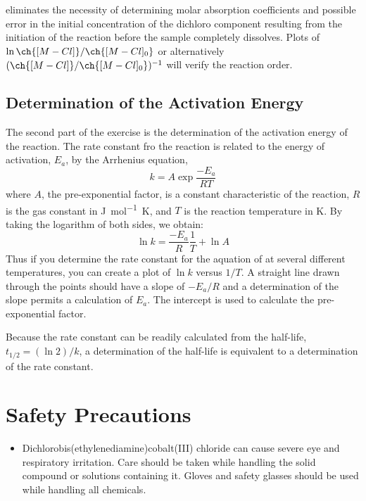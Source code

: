  eliminates the necessity of determining molar absorption coefficients and possible error in the initial concentration of the dichloro component resulting from the initiation of the reaction before the sample completely dissolves. 
Plots of \(\ln{\ch{[M-Cl]}/\ch{[M-Cl]_0}}\) or alternatively \(({\ch{[M-Cl]}/\ch{[M-Cl]_0}})^{-1}\)  will verify the reaction order. 

\subsection{Determination of the Activation Energy}
\label{subs:determination_of_activation_energy}

The second part of the exercise is the determination of the activation energy of the reaction. 
The rate constant fro the reaction is related to the energy of activation, \(E_a\), by the Arrhenius equation, 
\begin{equation}
	k = A \exp{\frac{-E_a}{RT}}
	\label{eq:arrhenius}
\end{equation}
where \(A\), the pre-exponential factor, is a constant characteristic of the reaction, \(R\) is the gas constant in \unit{\joule\per\mole\kelvin}, and \(T\) is the reaction temperature in \unit{\kelvin}. 
By taking the logarithm of both sides, we obtain:
\begin{equation}
	\ln{k} = \frac{-E_a}{R} \frac{1}{T} + \ln{A}
	\label{eq:arrhenius_linear}
\end{equation}
Thus if you determine the rate constant for the aquation of  at several different temperatures, you can create a plot of \(\ln{k}\) versus \(1/T\). 
A straight line drawn through the points should have a slope of \(-E_a/R\) and a determination of the slope permits a calculation of \(E_a\). 
The intercept is used to calculate the pre-exponential factor. 

Because the rate constant can be readily calculated from the half-life, \(t_{1/2} = (\ln{2}) / k\), a determination of the half-life is equivalent to a determination of the rate constant. 

\section{Safety Precautions}
\label{sec:safety}

\begin{itemize}
	\item Dichlorobis(ethylenediamine)cobalt(III) chloride can cause severe eye and respiratory irritation. Care should be taken while handling the solid compound or solutions containing it. Gloves and safety glasses should be used while handling all chemicals. 
\end{itemize}

